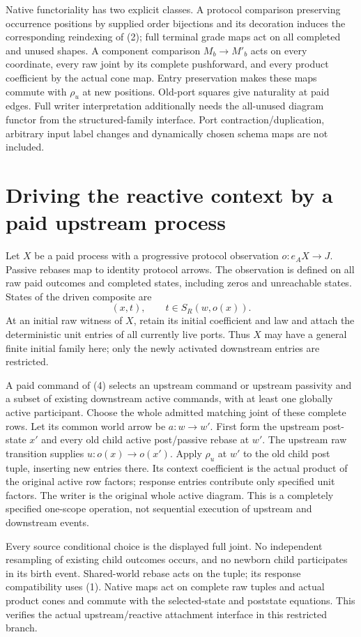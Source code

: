 \documentclass[11pt]{article}\usepackage{amsmath,amssymb,amsthm,geometry}\geometry{margin=1in}
\begin{document}
Native functoriality has two explicit classes. A protocol comparison preserving occurrence positions by supplied order bijections and its decoration induces the corresponding reindexing of (2); full terminal grade maps act on all completed and unused shapes. A component comparison $M_b\to M'_b$ acts on every coordinate, every raw joint by its complete pushforward, and every product coefficient by the actual cone map. Entry preservation makes these maps commute with $\rho_u$ at new positions. Old-port squares give naturality at paid edges. Full writer interpretation additionally needs the all-unused diagram functor from the structured-family interface. Port contraction/duplication, arbitrary input label changes and dynamically chosen schema maps are not included.

\section{Driving the reactive context by a paid upstream process}
Let $X$ be a paid process with a progressive protocol observation $o:e_AX\to J$. Passive rebases map to identity protocol arrows. The observation is defined on all raw paid outcomes and completed states, including zeros and unreachable states. States of the driven composite are
\[
 (x,t),\qquad t\in S_R(w,o(x)).                         \tag{4}
\]
At an initial raw witness of $X$, retain its initial coefficient and law and attach the deterministic unit entries of all currently live ports. Thus $X$ may have a general finite initial family here; only the newly activated downstream entries are restricted.

A paid command of (4) selects an upstream command or upstream passivity and a subset of existing downstream active commands, with at least one globally active participant. Choose the whole admitted matching joint of these complete rows. Let its common world arrow be $a:w\to w'$. First form the upstream post-state $x'$ and every old child active post/passive rebase at $w'$. The upstream raw transition supplies $u:o(x)\to o(x')$. Apply $\rho_u$ at $w'$ to the old child post tuple, inserting new entries there. Its context coefficient is the actual product of the original active row factors; response entries contribute only specified unit factors. The writer is the original whole active diagram. This is a completely specified one-scope operation, not sequential execution of upstream and downstream events.

Every source conditional choice is the displayed full joint. No independent resampling of existing child outcomes occurs, and no newborn child participates in its birth event. Shared-world rebase acts on the tuple; its response compatibility uses (1). Native maps act on complete raw tuples and actual product cones and commute with the selected-state and poststate equations. This verifies the actual upstream/reactive attachment interface in this restricted branch.
\end{document}
